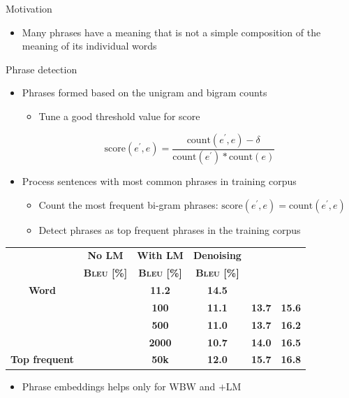 \documentclass[11pt, a4paper, landscape]{article}
\begin{document}
\NewPage
{}
Motivation
\begin{itemize}
	\item Many phrases have a meaning that is not a simple composition of the meaning of its individual words\\
\end{itemize}
Phrase detection
\begin{itemize}
	\item Phrases formed based on the unigram and bigram counts\\
	\cite{mikolov2013distributed} 
	\begin{itemize}
		\item Tune a good threshold value for score
	\end{itemize}
	\[ \textrm{score}(e^\prime, e) = \frac{\textrm{count}(e^\prime, e) - \delta}{\textrm{count}(e^\prime)*\textrm{count}(e)} \]	
	\item Process sentences with most common phrases in training corpus
	\begin{itemize}
		\item Count the most frequent bi-gram phrases: ${\textrm{score}(e^\prime, e) = \textrm{count}(e^\prime, e)}$
		\item Detect phrases as top frequent phrases in the training corpus
	\end{itemize}
	
\end{itemize}	
\NewPage
{}
\vfill
\begin{table}[]
	\centering
	\begin{tabular}{>{\bfseries}c>{\bfseries}c>{\bfseries}c>{\bfseries}c>{\bfseries}c  >{\bfseries}c}
		\hline
		\multicolumn{3}{c}{\multirow{2}{*}{\textbf{Vocabulary}}}                  & No LM & With LM & Denoising \\
		\multicolumn{3}{c}{}                                         &  \textsc{Bleu} [\%]  &  \textsc{Bleu} [\%] & \textsc{Bleu} [\%]   \\ \hline
		Word            & \multicolumn{2}{l}{}              & 11.2 & 14.5  &\leavevmode\color{blue}{ 17.2} \\
		 \hline
		\multirow{3}{*}{\cite{mikolov2013distributed} } & \multirow{3}{*}{threshold} & 100  & 11.1 & 13.7  & 15.6 \\ \cline{3-6} 
		&                            & 500  & 11.0 & 13.7  & 16.2 \\ \cline{3-6} 
		&                            & 2000 & 10.7 & 14.0  &16.5 \\ \hline
		Top frequent              & \multicolumn{1}{l}{\textbf{count}}  & 50k  & \leavevmode\color{blue}12.0 & \leavevmode\color{blue}15.7  & 16.8 \\ \hline
	\end{tabular}
\end{table}
\begin{itemize}
	\item Phrase embeddings helps only for WBW and  $+$LM
\end{itemize}
\vfill
\end{document}
